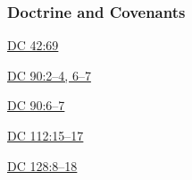 		
	\subsubsection{Doctrine and Covenants} %
		\label{KEY-DC}
	
		
		\begin{compactdesc}
			\item[{\hyperref[DC42-69]{DC 42:69}}]
			\item[{\hyperref[DC90-2]{DC 90:2--4, 6--7}}]
			\item[{\hyperref[DC90-6]{DC 90:6--7}}]
			\item[{\hyperref[DC112-15]{DC 112:15--17}}]
			\item[{\hyperref[DC128-8]{DC 128:8--18}}]
		\end{compactdesc}
		
	
		
		

	
